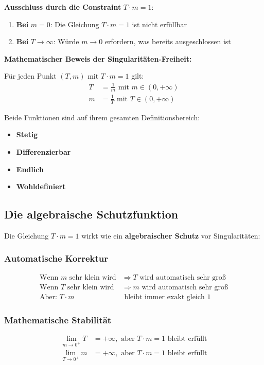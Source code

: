 \documentclass[12pt,a4paper]{article}
\theoremstyle{definition}
\theoremstyle{remark}
\begin{document}
\textbf{Ausschluss durch die Constraint} $T \cdot m = 1$:
\begin{enumerate}
	\item \textbf{Bei} $m = 0$: Die Gleichung $T \cdot m = 1$ ist nicht erfüllbar
	\item \textbf{Bei} $T \to \infty$: Würde $m \to 0$ erfordern, was bereits ausgeschlossen ist
\end{enumerate}

\textbf{Mathematischer Beweis der Singularitäten-Freiheit:}

Für jeden Punkt $(T,m)$ mit $T \cdot m = 1$ gilt:
\begin{align}
	T &= \frac{1}{m} \text{ mit } m \in (0, +\infty)\\
	m &= \frac{1}{T} \text{ mit } T \in (0, +\infty)
\end{align}

Beide Funktionen sind auf ihrem gesamten Definitionsbereich:
\begin{itemize}
	\item \textbf{Stetig}
	\item \textbf{Differenzierbar}
	\item \textbf{Endlich}
	\item \textbf{Wohldefiniert}
\end{itemize}

\subsection{Die algebraische Schutzfunktion}

Die Gleichung $T \cdot m = 1$ wirkt wie ein \textbf{algebraischer Schutz} vor Singularitäten:

\subsubsection{Automatische Korrektur}
\begin{align}
	\text{Wenn } m \text{ sehr klein wird} &\Rightarrow T \text{ wird automatisch sehr groß}\\
	\text{Wenn } T \text{ sehr klein wird} &\Rightarrow m \text{ wird automatisch sehr groß}\\
	\text{Aber: } T \cdot m &\text{ bleibt immer exakt gleich } 1
\end{align}

\subsubsection{Mathematische Stabilität}
\begin{align}
	\lim_{m \to 0^+} T &= +\infty, \text{ aber } T \cdot m = 1 \text{ bleibt erfüllt}\\
	\lim_{T \to 0^+} m &= +\infty, \text{ aber } T \cdot m = 1 \text{ bleibt erfüllt}
\end{align}
\end{document}
